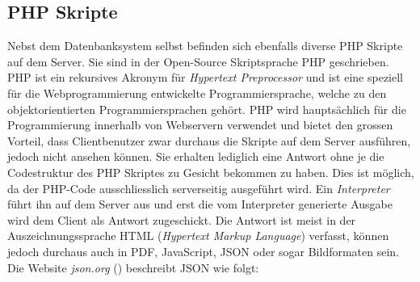 \documentclass[a4paper,11pt]{report}
\begin{document}
				
				\subsection{PHP Skripte} \label{ssec:PHP}
				Nebst dem Datenbanksystem selbst befinden sich ebenfalls diverse PHP Skripte auf dem Server. Sie sind in der Open-Source Skriptsprache PHP geschrieben. PHP ist ein rekursives Akronym für \emph{Hypertext Preprocessor} und ist eine speziell für die Webprogrammierung entwickelte Programmiersprache, welche zu den objektorientierten Programmiersprachen gehört. PHP wird hauptsächlich für die Programmierung innerhalb von Webservern verwendet und bietet den grossen Vorteil, dass Clientbenutzer zwar durchaus die Skripte auf dem Server ausführen, jedoch nicht ansehen können. Sie erhalten lediglich eine Antwort ohne je die Codestruktur des PHP Skriptes zu Gesicht bekommen zu haben.\cite{PHP} Dies ist möglich, da der PHP-Code ausschliesslich serverseitig ausgeführt wird. Ein \emph{Interpreter} führt ihn auf dem Server aus und erst die vom Interpreter generierte Ausgabe wird dem Client als Antwort zugeschickt. Die Antwort ist meist in der Auszeichnungssprache HTML (\emph{Hypertext Markup Language}) verfasst, können jedoch durchaus auch in PDF, JavaScript, JSON oder sogar Bildformaten sein.\cite{PHP:function} Die Website \emph{json.org} (\cite{JSON}) beschreibt JSON wie folgt:
				
\end{document}
